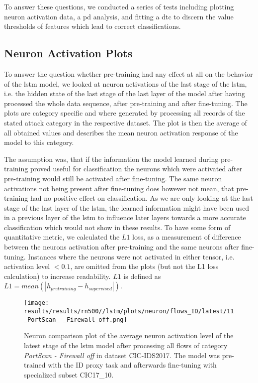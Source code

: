 To answer these questions, we conducted a series of tests including plotting neuron activation data, a \gls{pd} analysis, and fitting a \gls{dtc} to discern the value thresholds of features which lead to correct classifications. 

\subsection{Neuron Activation Plots} \label{sec:results:explainability:nap}

To answer the question whether pre-training had any effect at all on the behavior of the \gls{lstm} model, we looked at neuron activations of the last stage of the \gls{lstm}, i.e. the hidden state of the last stage of the last layer of the model after having processed the whole data sequence, after pre-training and after fine-tuning. The plots are category specific and where generated by processing all records of the stated attack category in the respective dataset. The plot is then the average of all obtained values and describes the mean neuron activation response of the model to this category. \par
The assumption was, that if the information the model learned during pre-training proved useful for classification the neurons which were activated after pre-training would still be activated after fine-tuning. The same neuron activations not being present after fine-tuning does however not mean, that pre-training had no positive effect on classification. As we are only looking at the last stage of the last layer of the \gls{lstm}, the learned information might have been used in a previous layer of the \gls{lstm} to influence later layers towards a more accurate classification which would not show in these results. To have some form of quantitative metric, we calculated the $L1$ loss, as a measurement of difference between the neurons activation after pre-training and the same neurons after fine-tuning. Instances where the neurons were not activated in either tensor, i.e. activation level $< 0.1$, are omitted from the plots (but not the L1 loss calculation) to increase readability. $L1$ is defined as $L1 = mean(|h_{pretraining} - h_{supervised}|)$.

\begin{figure}[h]
	\centering
	\texttt{[image: results/results/rn500//lstm/plots/neuron/flows\_ID/latest/11\_PortScan\_-\_Firewall\_off.png]}
	\caption{Neuron comparison plot of the average neuron activation level of the latest stage of the \gls{lstm} model after processing all 
	flows of category \textit{PortScan - Firewall off} in dataset CIC-IDS2017. The model was pre-trained with the ID proxy task and afterwards fine-tuning 
	with specialized subset CIC17\_10.}
	\label{fig:results:lstm:neuron:cic17_id_port_scan_firewall_off}
\end{figure}

